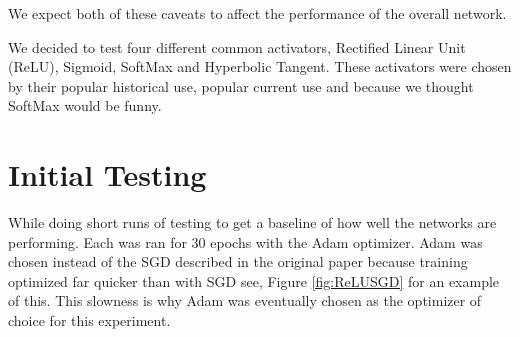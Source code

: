 \documentclass{article}
\begin{document}
We expect both of these caveats to affect the performance of the overall network.

We decided to test four different common activators, Rectified Linear Unit (ReLU), Sigmoid, SoftMax and Hyperbolic Tangent.
These activators were chosen by their popular historical use, popular current use and because we thought SoftMax would be funny.

\section{ Initial Testing}

While doing short runs of testing to get a baseline of how well the networks are performing.
Each was ran for 30 epochs with the Adam optimizer.
Adam was chosen instead of the SGD described in the original paper because training optimized far quicker than with SGD see, Figure \ref{fig:ReLUSGD} for an example of this.
This slowness is why Adam was eventually chosen as the optimizer of choice for this experiment.
\end{document}
